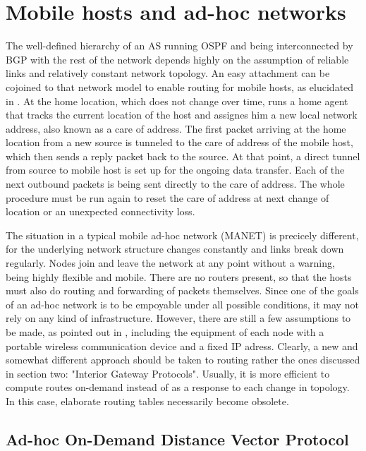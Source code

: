 \documentclass{acm_proc_article-sp}
\begin{document}
\section{Mobile hosts and ad-hoc networks}

The well-defined hierarchy of an AS running OSPF and being interconnected by BGP with the rest of the network depends highly on the assumption of reliable links and relatively constant network topology. An easy attachment can be cojoined to that network model to enable routing for mobile hosts, as elucidated in \cite{tanenbaum}. At the home location, which does not change over time, runs a home agent that tracks the current location of the host and assignes him a new local network address, also known as a care of address. The first packet arriving at the home location from a new source is tunneled to the care of address of the mobile host, which then sends a reply packet back to the source. At that point, a direct tunnel from source to mobile host is set up for the ongoing data transfer. Each of the next outbound packets is being sent directly to the care of address. The whole procedure must be run again to reset the care of address at next change of location or an unexpected connectivity loss.  

The situation in a typical mobile ad-hoc network (MANET) is precicely different, for the underlying network structure changes constantly and links break down regularly. Nodes join and leave the network at any point without a warning, being highly flexible and mobile. There are no routers present, so that the hosts must also do routing and forwarding of packets themselves. Since one of the goals of an ad-hoc network is to be empoyable under all possible conditions, it may not rely on any kind of infrastructure. However, there are still a few assumptions to be made, as pointed out in \cite{haas}, including the equipment of each node with a portable wireless communication device and a fixed IP adress. Clearly, a new and somewhat different approach should be taken to routing rather the ones discussed in section two: "Interior Gateway Protocols". Usually, it is more efficient to compute routes on-demand instead of as a response to each change in topology. In this case, elaborate routing tables necessarily become obsolete.

\subsection{Ad-hoc On-Demand Distance Vector Protocol}
\end{document}
